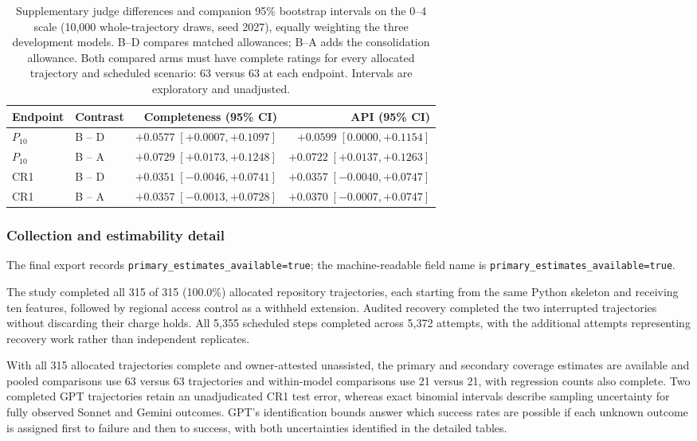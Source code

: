 \begin{table}[!htbp]
\centering\small
\caption{Supplementary judge differences and companion 95\% bootstrap
intervals on the 0--4 scale (10,000 whole-trajectory draws, seed 2027),
equally weighting the three development models. B--D compares matched
allowances; B--A adds the consolidation allowance. Both compared arms must
have complete ratings for every allocated trajectory and scheduled scenario:
63 versus 63 at each endpoint. Intervals are exploratory and unadjusted.}\label{tab:resultsjudgecontrasts}

\begin{tabular*}{\textwidth}{@{\extracolsep{\fill}}llrr@{}}
\toprule
Endpoint & Contrast & Completeness (95\% CI) & API (95\% CI) \\
\midrule
$P_{10}$ & B -- D & $+0.0577\;[+0.0007,+0.1097]$ & $+0.0599\;[0.0000,+0.1154]$ \\
$P_{10}$ & B -- A & $+0.0729\;[+0.0173,+0.1248]$ & $+0.0722\;[+0.0137,+0.1263]$ \\
CR1 & B -- D & $+0.0351\;[-0.0046,+0.0741]$ & $+0.0357\;[-0.0040,+0.0747]$ \\
CR1 & B -- A & $+0.0357\;[-0.0013,+0.0728]$ & $+0.0370\;[-0.0007,+0.0747]$ \\
\bottomrule
\end{tabular*}
\end{table}


\subsubsection{Collection and estimability detail}

The final export records \texttt{primary\_estimates\_available=true};
the machine-readable field name is \nolinkurl{primary_estimates_available=true}.

The study completed all 315 of 315 (100.0\%) allocated repository trajectories, each starting from the same Python skeleton and receiving ten
features, followed by regional access control as a withheld extension.
Audited recovery completed the two interrupted trajectories without
discarding their charge holds. All 5,355 scheduled steps completed across 5,372 attempts, with the additional attempts representing recovery work rather than independent replicates.

With all 315 allocated trajectories complete and owner-attested unassisted,
the primary and secondary coverage estimates are available
and pooled comparisons use
63 versus 63 trajectories and within-model comparisons use 21 versus 21, with regression counts also complete. Two completed GPT trajectories retain an unadjudicated CR1 test error, whereas exact binomial intervals describe sampling uncertainty for fully observed
Sonnet and Gemini outcomes. GPT's identification bounds answer which success rates are possible if each unknown outcome is assigned first to failure and then to success, with both uncertainties identified in the detailed tables.
